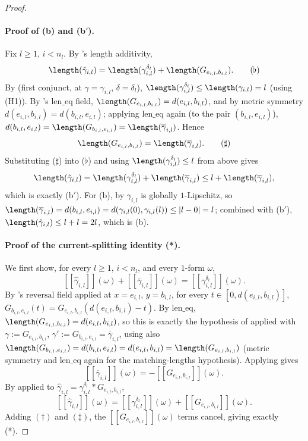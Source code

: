 \begin{proof}
  \paragraph{Proof of (b) and (b$'$).} Fix $l\ge1$, $i<n_l$. By 's length
  additivity,
  \[
    \length(\hat\gamma_{i,l}) = \length(\gamma_{i,l}^{\delta_l}) + \length(G_{e_{i,l},b_{i,l}})
    . \tag{$\flat$}
  \]
  By  (first conjunct, at $\gamma=\gamma_{i,l}$,
  $\delta=\delta_l$), $\length(\gamma_{i,l}^{\delta_l}) \le \length(\gamma_{i,l}) = l$ (using
  (H1)). By 's $\mathrm{len\_eq}$ field, $\length(G_{e_{i,l},b_{i,l}}) =
  d(e_{i,l},b_{i,l})$, and by metric symmetry $d(e_{i,l},b_{i,l}) = d(b_{i,l},e_{i,l})$; applying
  $\mathrm{len\_eq}$ again (to the pair $(b_{i,l},e_{i,l})$), $d(b_{i,l},e_{i,l}) =
  \length(G_{b_{i,l},e_{i,l}}) = \length(\overline\gamma_{i,l})$. Hence
  \[
    \length(G_{e_{i,l},b_{i,l}}) = \length(\overline\gamma_{i,l})
    . \tag{$\sharp$}
  \]
  Substituting ($\sharp$) into ($\flat$) and using $\length(\gamma_{i,l}^{\delta_l}) \le l$ from
  above gives
  \[
    \length(\hat\gamma_{i,l}) = \length(\gamma_{i,l}^{\delta_l}) + \length(\overline\gamma_{i,l})
    \le l + \length(\overline\gamma_{i,l})
    ,
  \]
  which is exactly (b$'$). For (b), by  $\gamma_{i,l}$ is globally
  $1$-Lipschitz, so $\length(\overline\gamma_{i,l}) = d(b_{i,l},e_{i,l}) =
  d(\gamma_{i,l}(0),\gamma_{i,l}(l)) \le |l-0| = l$; combined with (b$'$),
  $\length(\hat\gamma_{i,l}) \le l + l = 2l$, which is (b).

  \paragraph{Proof of the current-splitting identity (*).} We first show, for every $l\ge1$,
  $i<n_l$, and every $1$-form $\omega$,
  \[
    [[\hat\gamma_{i,l}]](\omega) + [[\overline\gamma_{i,l}]](\omega)
      = [[\gamma_{i,l}^{\delta_l}]](\omega)
    . \tag{*}
  \]
  By 's $\mathrm{reversal}$ field applied at $x=e_{i,l}$, $y=b_{i,l}$, for
  every $t \in [0,d(e_{i,l},b_{i,l})]$, $G_{b_{i,l},e_{i,l}}(t) = G_{e_{i,l},b_{i,l}}(d(e_{i,l},b_{i,l})-t)$.
  By $\mathrm{len\_eq}$, $\length(G_{e_{i,l},b_{i,l}}) = d(e_{i,l},b_{i,l})$, so this is exactly the
  hypothesis of  applied with $\gamma := G_{e_{i,l},b_{i,l}}$,
  $\gamma' := G_{b_{i,l},e_{i,l}} = \overline\gamma_{i,l}$, using also
  $\length(G_{b_{i,l},e_{i,l}}) = d(b_{i,l},e_{i,l}) = d(e_{i,l},b_{i,l}) = \length(G_{e_{i,l},b_{i,l}})$
  (metric symmetry and $\mathrm{len\_eq}$ again for the matching-lengths hypothesis). Applying
   gives
  \[
    [[\overline\gamma_{i,l}]](\omega) = -[[G_{e_{i,l},b_{i,l}}]](\omega)
    . \tag{$\dagger$}
  \]
  By  applied to $\hat\gamma_{i,l} = \gamma_{i,l}^{\delta_l} *
  G_{e_{i,l},b_{i,l}}$,
  \[
    [[\hat\gamma_{i,l}]](\omega) = [[\gamma_{i,l}^{\delta_l}]](\omega) +
      [[G_{e_{i,l},b_{i,l}}]](\omega)
    . \tag{$\ddagger$}
  \]
  Adding $(\dagger)$ and $(\ddagger)$, the $[[G_{e_{i,l},b_{i,l}}]](\omega)$ terms cancel, giving
  exactly (*).


\end{proof}
